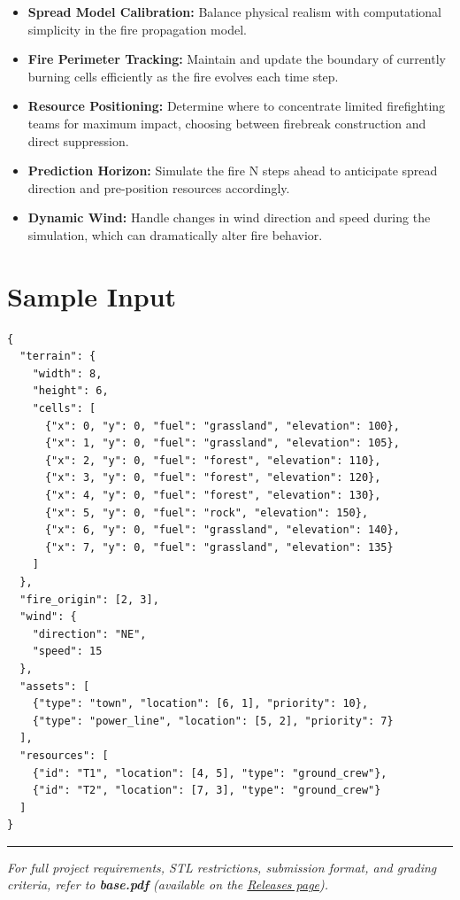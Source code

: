 \begin{itemize}
  \item \textbf{Spread Model Calibration:} Balance physical realism with computational simplicity in the fire propagation model.
  \item \textbf{Fire Perimeter Tracking:} Maintain and update the boundary of currently burning cells efficiently as the fire evolves each time step.
  \item \textbf{Resource Positioning:} Determine where to concentrate limited firefighting teams for maximum impact, choosing between firebreak construction and direct suppression.
  \item \textbf{Prediction Horizon:} Simulate the fire N steps ahead to anticipate spread direction and pre-position resources accordingly.
  \item \textbf{Dynamic Wind:} Handle changes in wind direction and speed during the simulation, which can dramatically alter fire behavior.
\end{itemize}

\section{Sample Input}

\begin{lstlisting}[style=json, caption={data/input\_sample.json}]
{
  "terrain": {
    "width": 8,
    "height": 6,
    "cells": [
      {"x": 0, "y": 0, "fuel": "grassland", "elevation": 100},
      {"x": 1, "y": 0, "fuel": "grassland", "elevation": 105},
      {"x": 2, "y": 0, "fuel": "forest", "elevation": 110},
      {"x": 3, "y": 0, "fuel": "forest", "elevation": 120},
      {"x": 4, "y": 0, "fuel": "forest", "elevation": 130},
      {"x": 5, "y": 0, "fuel": "rock", "elevation": 150},
      {"x": 6, "y": 0, "fuel": "grassland", "elevation": 140},
      {"x": 7, "y": 0, "fuel": "grassland", "elevation": 135}
    ]
  },
  "fire_origin": [2, 3],
  "wind": {
    "direction": "NE",
    "speed": 15
  },
  "assets": [
    {"type": "town", "location": [6, 1], "priority": 10},
    {"type": "power_line", "location": [5, 2], "priority": 7}
  ],
  "resources": [
    {"id": "T1", "location": [4, 5], "type": "ground_crew"},
    {"id": "T2", "location": [7, 3], "type": "ground_crew"}
  ]
}
\end{lstlisting}

\vfill
\noindent\rule{\textwidth}{0.4pt}
{\small\textit{For full project requirements, STL restrictions, submission format, and grading criteria, refer to \textbf{base.pdf} (available on the \href{https://github.com/BestSithInEU/cse211-term-projects/releases}{Releases page}).}}
